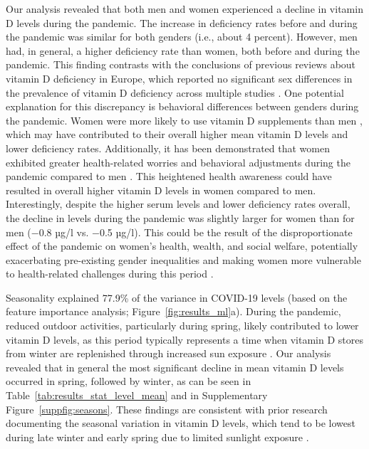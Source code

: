 \documentclass[12pt]{article}
\begin{document}
Our analysis revealed that both men and women experienced a decline in vitamin D levels during the pandemic. The increase in deficiency rates before and during the pandemic was similar for both genders (i.e., about 4 percent). However, men had, in general, a higher deficiency rate than women, both before and during the pandemic. This finding contrasts with the conclusions of previous reviews about vitamin D deficiency in Europe, which reported no significant sex differences in the prevalence of vitamin D deficiency across multiple studies \cite{Cashman2016}. One potential explanation for this discrepancy is behavioral differences between genders during the pandemic. Women were more likely to use vitamin D supplements than men \cite{Dickinson2014}, which may have contributed to their overall higher mean vitamin D levels and lower deficiency rates. Additionally, it has been demonstrated that women exhibited greater health-related worries and behavioral adjustments during the pandemic compared to men \cite{Barber2021}. This heightened health awareness could have resulted in overall higher vitamin D levels in women compared to men. Interestingly, despite the higher serum levels and lower deficiency rates overall, the decline in levels during the pandemic was slightly larger for women than for men ($-$0.8 µg/l vs. $-$0.5 µg/l). This could be the result of the disproportionate effect of the pandemic on women's health, wealth, and social welfare, potentially exacerbating pre-existing gender inequalities and making women more vulnerable to health-related challenges during this period \cite{Guerrina2021}.

Seasonality explained 77.9\% of the variance in COVID-19 levels (based on the feature importance analysis; Figure~\ref{fig:results_ml}a). During the pandemic, reduced outdoor activities, particularly during spring, likely contributed to lower vitamin D levels, as this period typically represents a time when vitamin D stores from winter are replenished through increased sun exposure \cite{Das2018}. Our analysis revealed that in general the most significant decline in mean vitamin D levels occurred in spring, followed by winter, as can be seen in Table~\ref{tab:results_stat_level_mean} and in Supplementary Figure~\ref{suppfig:seasons}. These findings are consistent with prior research documenting the seasonal variation in vitamin D levels, which tend to be lowest during late winter and early spring due to limited sunlight exposure \cite{Kasahara2013}.
\end{document}
